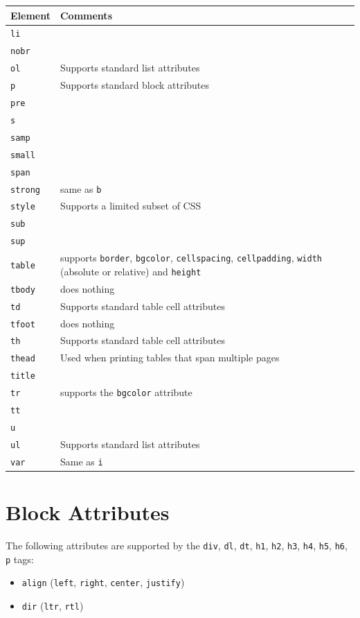 \documentclass[a4paper,10pt]{book}
\begin{document}
\begin{tabular}{p{3cm} p{10.6cm}}
\hline
\textbf{Element} & \textbf{Comments} \\
\hline
\verb|li| & \\
\verb|nobr| & \\
\verb|ol| & Supports standard list attributes\\
\verb|p| & Supports standard block attributes\\
\verb|pre| &\\
\verb|s| & \\
\verb|samp| & \\
\verb|small| & \\
\verb|span| & \\
\verb|strong| & same as \verb|b|\\
\verb|style| & Supports a limited subset of CSS\\
\verb|sub| &\\
\verb|sup| &\\
\verb|table| & supports \verb|border|, \verb|bgcolor|, \verb|cellspacing|, \verb|cellpadding|, \verb|width| (absolute or relative) and \verb|height|\\
\verb|tbody| & does nothing\\
\verb|td| & Supports standard table cell attributes\\
\verb|tfoot| & does nothing\\
\verb|th| & Supports standard table cell attributes\\
\verb|thead| & Used when printing tables that span multiple pages\\
\verb|title| & \\
\verb|tr| & supports the \verb|bgcolor| attribute\\
\verb|tt| & \\
\verb|u| & \\
\verb|ul| & Supports standard list attributes\\
\verb|var| & Same as \verb|i|\\
\hline
\end{tabular}

\section{Block Attributes}
The following attributes are supported by the \verb|div|, \verb|dl|, \verb|dt|, \verb|h1|, \verb|h2|, \verb|h3|, \verb|h4|, \verb|h5|, \verb|h6|, \verb|p| tags:
\begin{itemize}
\item \verb|align| (\verb|left|, \verb|right|, \verb|center|, \verb|justify|)
\item \verb|dir| (\verb|ltr|, \verb|rtl|)
\end{itemize}
\end{document}
